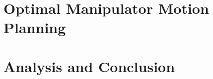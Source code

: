 \documentclass[letterpaper, 9pt, conference]{ieeeconf}  %
\begin{document}
\section{Optimal Manipulator Motion Planning}\label{Optimal_Manipulator_Motion_Planning}

\section{Analysis and Conclusion}







%
%
{}
\end{document}
